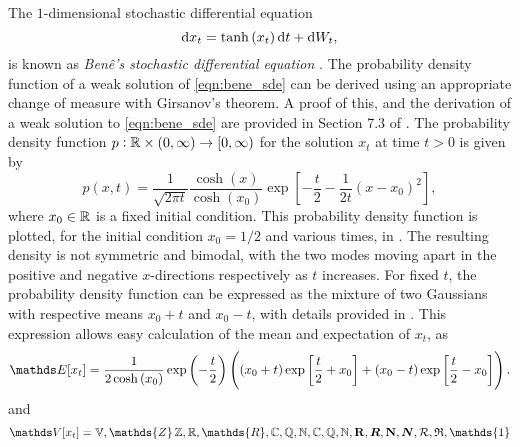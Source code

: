 \begin{example}
	The \(1\)-dimensional stochastic differential equation 
	\begin{equation}
		\sde{x_t}{\tanh\left(x_t\right)}{},
		\label{eqn:bene_sde}
	\end{equation}
	is known as \emph{Ben\^e's stochastic differential equation} \cite{SarkkaSolin_2019_AppliedStochasticDifferential}.
	The probability density function of a weak solution of \eqref{eqn:bene_sde} can be derived using an appropriate change of measure with Girsanov's theorem. 
	A proof of this, and the derivation of a weak solution to \eqref{eqn:bene_sde} are provided in Section 7.3 of \cite{SarkkaSolin_2019_AppliedStochasticDifferential}.
	The probability density function \(p: \mathbb{R} \times \left(0,\infty\right) \to \left[0,\infty\right)\) for the solution \(x_t\) at time \(t > 0\) is given by 
	\begin{equation}\label{eqn:bene_sde_pdf}
	p(x,t) = \frac{1}{\sqrt{2\pi t}}\frac{\cosh\left(x\right)}{\cosh\left(x_0\right)}\exp\left[-\frac{t}{2} - \frac{1}{2t}\left(x - x_0\right)^2\right],
\end{equation}
	where \(x_0 \in \mathbb{R}\) is a fixed initial condition.
	This probability density function is plotted, for the initial condition \(x_0 = 1/2\) and various times, in .
	The resulting density is not symmetric and bimodal, with the two modes moving apart in the positive and negative \(x\)-directions respectively as \(t\) increases.
	For fixed \(t\), the probability density function can be expressed as the mixture of two Gaussians with respective means \(x_0 + t\) and \(x_0 - t\), with details provided in .
	This expression allows easy calculation of the mean and expectation of \(x_t\), as 
	\[
		\avg{x_t} = \frac{1}{2\cosh\left(x_0\right)}\exp\left(-\frac{t}{2}\right)\left(\left(x_0 + t\right)\exp\left[\frac{t}{2} +x_0\right] + (x_0 - t)\exp\left[\frac{t}{2} - x_0\right]\right).
	\]
	and 
	\[
		\var{x_t} = \mathbb{V}, \mathds{Z} \,  \mathbb{Z}, \R, \mathds{R}, \mathbb{C}, \mathbb{Q}, \mathbb{N}, \C, \Q, \N, \mathbf{R}, \bm{R}, \mathbf{N}, \bm{N}, \mathcal{R}, \mathfrak{R}, \mathds{1}
	\]
\end{example}


\newcommand{\plotbenepdf}[2]{
\begin{tikzpicture}\begin{axis}[
		ymin=0.0,
		xmin=-10.0,
		xmax=10.0,
		axis lines=center,
		axis on top=true,
		domain=-10:10,
		ylabel=$p$,
		xlabel=$x$,
		ytick=\empty,
		yticklabels={},
	]
	\addplot [mark=none,draw=black,thick,samples=500] {cosh(\x)*exp(-#2/2-1/(2 * #2)*(\x-#1)^2)/((2 * pi * #2)^(1/2) * cosh(#1))};
\end{axis}
\end{tikzpicture}
}

